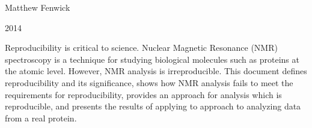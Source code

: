 \begin{titlepage}
  \begin{center}

  {\huge \mattftitle{}}

    \large

    \vspace{1cm}

    Matthew Fenwick

    2014
    
    Reproducibility is critical to science.
    Nuclear Magnetic Resonance (NMR) spectroscopy is a technique for studying 
    biological molecules such as proteins at the atomic level.
    However, NMR analysis is irreproducible.
    This document defines reproducibility and its significance, shows how NMR analysis fails to
    meet the requirements for reproducibility, provides an approach for analysis
    which is reproducible, and presents the results of applying to approach to
    analyzing data from a real protein.

  \end{center}
\end{titlepage}

